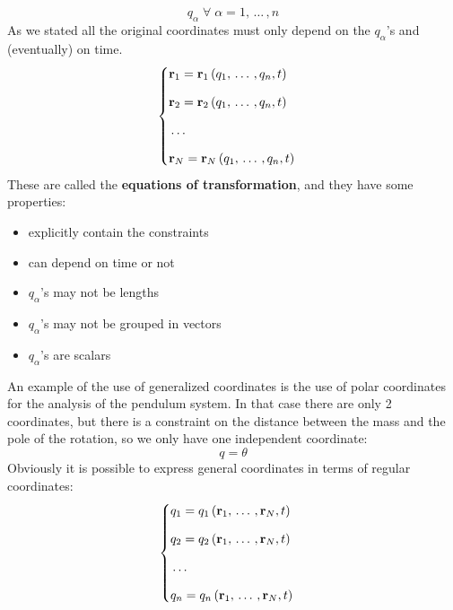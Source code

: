 \begin{equation}
    q_{\alpha}\;\forall\;\alpha = 1, \,\dots\, ,n
\end{equation}
As we stated all the original coordinates must only depend on the $q_{\alpha}$'s and (eventually) on time.
\begin{equation} \label{equations_of_transformation}
    \begin{cases}
        \vb{r}_1 = \vb{r}_1\left(q_1, \,\dots\, ,q_n,t\right)\\[8pt]
        \vb{r}_2 = \vb{r}_2\left(q_1, \,\dots\, ,q_n,t\right)\\[8pt]
         \,\dots\,  \\[8pt]
        \vb{r}_N = \vb{r}_N\left(q_1, \,\dots\, ,q_n,t\right)
    \end{cases}
\end{equation}
These are called the \textbf{equations of transformation}, and they have some properties:
\begin{itemize}
    \item explicitly contain the constraints
    \item can depend on time or not
    \item $q_{\alpha}$'s may not be lengths
    \item $q_{\alpha}$'s may not be grouped in vectors
    \item $q_{\alpha}$'s are scalars
\end{itemize}
An example of the use of generalized coordinates is the use of polar coordinates for the analysis of the pendulum system. In that case there are only 2 coordinates, but there is a constraint on the distance between the mass and the pole of the rotation, so we only have one independent coordinate:
\[q=\theta\]
Obviously it is possible to express general coordinates in terms of regular coordinates:
\begin{equation} \label{inverse_equations_of_transformation}
    \begin{cases}
        q_1 = q_1\left(\vb{r}_1, \,\dots\, ,\vb{r}_N,t\right)\\[8pt]
        q_2 = q_2\left(\vb{r}_1, \,\dots\, ,\vb{r}_N,t\right)\\[8pt]
         \,\dots\,  \\[8pt]
        q_n = q_n\left(\vb{r}_1, \,\dots\, ,\vb{r}_N,t\right)
    \end{cases}
\end{equation}
